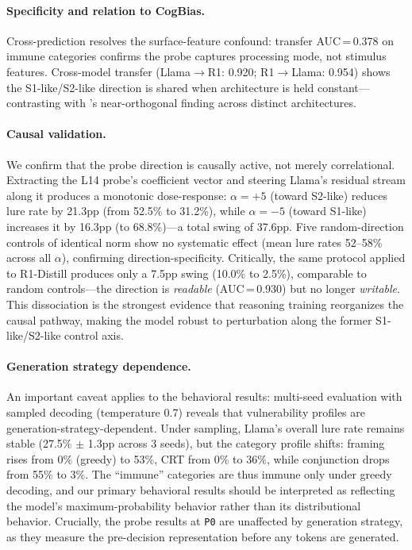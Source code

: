 \documentclass[accepted]{article}
\newcommand{\sone}{S1-like}
\newcommand{\stwo}{S2-like}
\newcommand{\pzero}{\texttt{P0}}
\begin{document}
\paragraph{Specificity and relation to CogBias.}
Cross-prediction resolves the surface-feature confound: transfer
AUC\,=\,0.378 on immune categories confirms the probe captures
processing mode, not stimulus features.  Cross-model transfer
(Llama$\to$R1: 0.920; R1$\to$Llama: 0.954) shows the \sone{}/\stwo{}
direction is shared when architecture is held constant---contrasting with
\citet{huang2026cogbias}'s near-orthogonal finding across distinct
architectures.

\paragraph{Causal validation.}
We confirm that the probe direction is causally active, not merely
correlational.  Extracting the L14 probe's coefficient vector and
steering Llama's residual stream along it produces a monotonic
dose-response: $\alpha = +5$ (toward \stwo{}) reduces lure rate by
21.3pp (from 52.5\% to 31.2\%), while $\alpha = -5$ (toward \sone{})
increases it by 16.3pp (to 68.8\%)---a total swing of 37.6pp.  Five
random-direction controls of identical norm show no systematic effect
(mean lure rates 52--58\% across all $\alpha$), confirming
direction-specificity.  Critically, the same protocol applied to R1-Distill produces only a 7.5pp swing (10.0\% to 2.5\%), comparable to random controls---the direction is \emph{readable} (AUC\,=\,0.930) but no longer \emph{writable}.  This dissociation is the strongest evidence that reasoning training reorganizes the causal pathway, making the model robust to perturbation along the former \sone{}/\stwo{} control axis.

\paragraph{Generation strategy dependence.}
An important caveat applies to the behavioral results: multi-seed evaluation
with sampled decoding (temperature 0.7) reveals that vulnerability profiles
are generation-strategy-dependent.  Under sampling, Llama's overall lure rate
remains stable (27.5\% $\pm$ 1.3pp across 3 seeds), but the category profile
shifts: framing rises from 0\% (greedy) to 53\%, CRT from 0\% to 36\%, while
conjunction drops from 55\% to 3\%.  The ``immune'' categories are thus immune
only under greedy decoding, and our primary behavioral results should be
interpreted as reflecting the model's maximum-probability behavior rather than
its distributional behavior.  Crucially, the probe results at \pzero{} are
unaffected by generation strategy, as they measure the pre-decision
representation before any tokens are generated.
\end{document}
